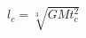 \documentclass[preview]{standalone}
\begin{document}
\begin{align*}
l_c=\sqrt[3]{G M  t_c^2}
\end{align*}
\end{document}
